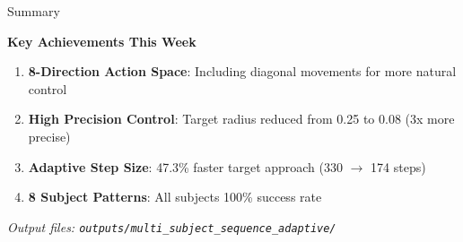 \documentclass[aspectratio=169, 11pt]{beamer}
\begin{document}
\begin{frame}{Summary}
    \begin{center}
    \Large
    \textbf{Key Achievements This Week}
    \end{center}
    
    \vspace{5mm}
    
    \begin{enumerate}
        \item \textbf{8-Direction Action Space}: Including diagonal movements for more natural control
        \item \textbf{High Precision Control}: Target radius reduced from 0.25 to 0.08 (3x more precise)
        \item \textbf{Adaptive Step Size}: 47.3\% faster target approach (330 $\rightarrow$ 174 steps)
        \item \textbf{8 Subject Patterns}: All subjects 100\% success rate
    \end{enumerate}
    
    \vspace{10mm}
    
    \begin{center}
    \textit{Output files: \texttt{outputs/multi\_subject\_sequence\_adaptive/}}
    \end{center}
\end{frame}
\end{document}
